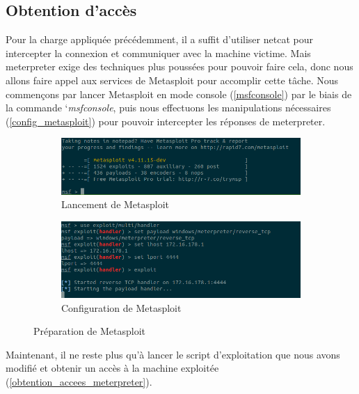     \subsection{Obtention d'accès}
    Pour la charge appliquée précédemment, il a suffit d'utiliser netcat pour intercepter la connexion et communiquer
    avec la machine victime. Mais meterpreter exige des techniques plus poussées pour pouvoir faire cela, 
    donc nous allons faire appel aux services de Metasploit pour accomplir cette tâche.
    Nous commençons par lancer Metasploit en mode console (\autoref{msfconsole}) par le biais de la commande 
    `\emph{msfconsole}, puis nous effectuons les manipulations nécessaires (\autoref{config_metasploit})
    pour pouvoir intercepter les réponses de meterpreter.

    \begin{figure}[H]
        \centering
        \begin{subfigure}{0.9\textwidth}
            \centering
            \includegraphics[width=\textwidth]{images/msfconsole.png}
            \caption{Lancement de Metasploit}
            \label{msfconsole}
        \end{subfigure}
        \hfill
        \begin{subfigure}{0.9\textwidth}
            \centering
            \includegraphics[width=\textwidth]{images/ecoute_msf.png}
            \caption{Configuration de Metasploit}
            \label{config_metasploit}
        \end{subfigure}
        \hfill
        \caption{Préparation de Metasploit}
        \label{prepration_metasploit}
    \end{figure}

    Maintenant, il ne reste plus qu'à lancer le script d'exploitation que nous avons modifié et obtenir un accès à la 
    machine exploitée (\autoref{obtention_accees_meterpreter}).

